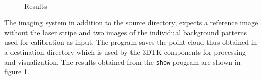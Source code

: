 \begin{figure}[ht!]
\quad
{}\\
\caption{Results}
\label{figure:results}
\end{figure}

The imaging system in addition to the source directory, expects a reference
image without the laser stripe and two images of the individual background
patterns used for calibration as input. The program saves the point cloud thus
obtained in a destination directory which is used by the \ac{3DTK} components
for processing and visualization. The results obtained from the
\texttt{show} program are shown in figure \ref{figure:results}.
